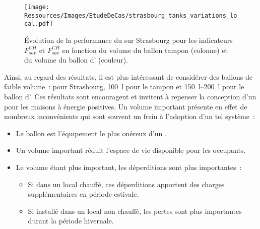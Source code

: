 \begin{figure}
    \centering
    \texttt{[image: Ressources/Images/EtudeDeCas/strasbourg\_tanks\_variations\_local.pdf]}
    \caption[Performance du  sur Strasbourg en fonction du volume des ballons]
             {Évolution de la performance du  sur Strasbourg pour les indicateurs $F_{sav}^{CH}$
              et $F_{sav}^{CH}$ en fonction du volume du ballon tampon (colonne) et
              du volume du ballon d’ (couleur).}
    \label{fig:tanks_variations_locales_strasbourg}
\end{figure}

Ainsi, au regard des résultats, il est plus intéressant de considérer des ballons
de faible volume~: pour Strasbourg, \SI{100}{\litre} pour le tampon et \SIrange{150}{200}{\litre} pour le ballon d’.
Ces résultats sont encouragent et invitent à repenser la conception d’un  pour
les maisons à énergie positives.
Un volume important présente en effet de nombreux inconvénients qui sont souvent un frein
à l’adoption d’un tel système~:
\begin{itemize}
    \item Le ballon est l’équipement le plus onéreux d’un .
    \item Un volume important réduit l’espace de vie disponible pour les occupants.
    \item Le volume étant plus important, les déperditions sont plus importantes~:
    \begin{itemize}
        \item Si dans un local chauffé, ces déperditions apportent des charges supplémentaires
              en période estivale.
        \item Si installé dans un local non chauffé, les pertes sont plus importantes
              durant la période hivernale.
    \end{itemize}
\end{itemize}


